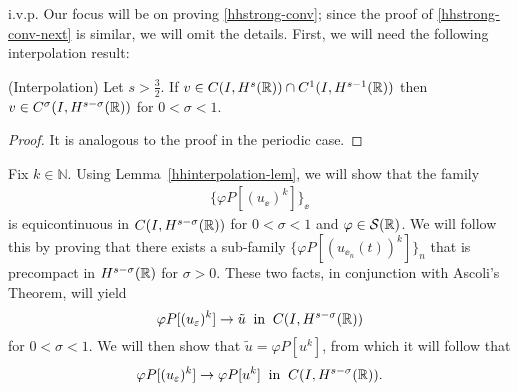 i.v.p. Our focus will be on proving \eqref{hhstrong-conv}; since the proof of
\eqref{hhstrong-conv-next} is similar, we will omit the
details. First, we will need the following
interpolation result:
%
%
%
%
\begin{lemma}
\label{hhinterpolation-lem}
(Interpolation)     Let  $s > \frac{3}{2}$.
If $v \in C(I, H^s(\mathbb{R})) \cap C^1(I, H^{s-1}(\mathbb{R}))$
then $v \in C^\sigma (I, H^{s- \sigma}(\mathbb{R}))$ for  $0 < \sigma < 1$.
\end{lemma}
%
\begin{proof} It is analogous to the proof in the periodic case.
\end{proof}
Fix $k \in \mathbb{N}$. Using Lemma~\ref{hhinterpolation-lem}, we
will show that the family
\begin{equation*}
\begin{split}
\{\varphi P[(u_\ee)^k]\}_\ee
\end{split}
\end{equation*}
is equicontinuous in $C(I, H^{s-\sigma}(\mathbb{R}))$ 
for $0 < \sigma < 1$ and $\varphi \in \mathcal{S}(\mathbb{R})$.
We will follow this by proving that
there exists a sub-family $\{\varphi P[(u_{\ee_n}(t))^k]\}_n$
that is precompact in $H^{s-\sigma}(\mathbb{R})$ for $\sigma > 0$. 
These two facts, in conjunction with Ascoli's Theorem, will
yield
\begin{equation*}
\label{hhstrong-conv2}
\varphi P[(u_\varepsilon)^k] \to \tilde{u}
\; \; \text{in} \; \; C(I,H^{s-\sigma}(\mathbb{R}))
\end{equation*}
for $0 < \sigma < 1$.
We will then show that $\tilde{u} = \varphi P[u^k]$, from which it will
follow that
\begin{equation*}
\label{hhphiplus}
\begin{split}
\varphi P[(u_\varepsilon)^k] \to \varphi P[u^k]
\; \; \text{in} \; \; C(I,H^{s-\sigma}(\mathbb{R})).
\end{split}
\end{equation*}
%
%
%
%
%
